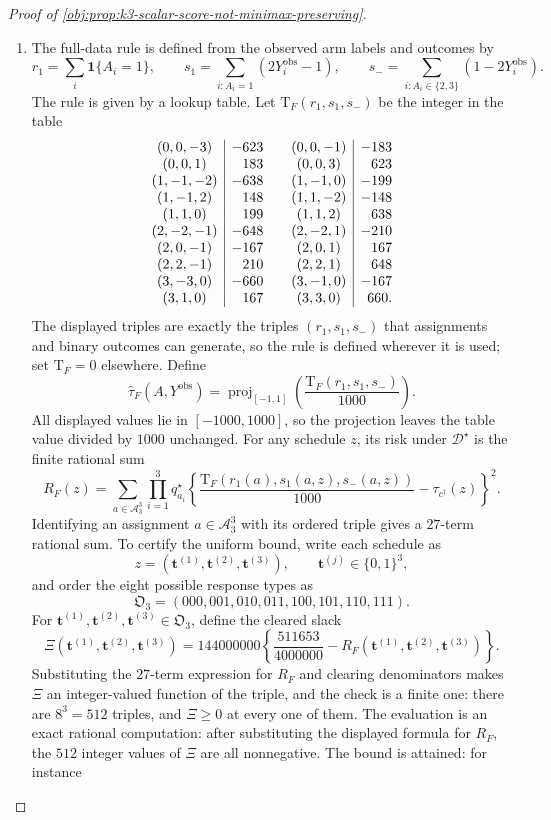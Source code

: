 \documentclass[11pt]{article}
\begin{document}
\begin{proof}[Proof of \cref{obj:prop:k3-scalar-score-not-minimax-preserving}]
\begin{enumerate}
\item
The full-data rule is defined from the observed arm labels and outcomes by
\[
r_1=\sum_i\mathbf 1\{A_i=1\},\qquad
s_1=\sum_{i:A_i=1}(2Y_i^{\mathrm{obs}}-1),\qquad
s_-=\sum_{i:A_i\in\{2,3\}}(1-2Y_i^{\mathrm{obs}}).
\]
The rule is given by a lookup table.  Let \(\mathrm T_F(r_1,s_1,s_-)\) be the integer in the table
\[
\begin{array}{c|r@{\qquad}c|r}
(0,0,-3)&-623&(0,0,-1)&-183\\
(0,0,1)&183&(0,0,3)&623\\
(1,-1,-2)&-638&(1,-1,0)&-199\\
(1,-1,2)&148&(1,1,-2)&-148\\
(1,1,0)&199&(1,1,2)&638\\
(2,-2,-1)&-648&(2,-2,1)&-210\\
(2,0,-1)&-167&(2,0,1)&167\\
(2,2,-1)&210&(2,2,1)&648\\
(3,-3,0)&-660&(3,-1,0)&-167\\
(3,1,0)&167&(3,3,0)&660 .
\end{array}
\]
The displayed triples are exactly the triples \((r_1,s_1,s_-)\) that assignments and binary outcomes can generate, so the rule is defined wherever it is used; set \(\mathrm T_F=0\) elsewhere. Define
\[
\widehat\tau_F(A,Y^{\mathrm{obs}})
=
\operatorname{proj}_{[-1,1]}\!\left(\frac{\mathrm T_F(r_1,s_1,s_-)}{1000}\right).
\]
All displayed values lie in \([-1000,1000]\), so the projection leaves the table value divided by \(1000\) unchanged. For any schedule \(z\), its risk under \(\mathcal D^\star\) is the finite rational sum
\[
R_F(z)
=
\sum_{a\in\mathcal A_3^3}
\prod_{i=1}^3 q^\star_{a_i}
\left\{
\frac{\mathrm T_F(r_1(a),s_1(a,z),s_-(a,z))}{1000}
-\tau_{c^\dagger}(z)
\right\}^2 .
\]
Identifying an assignment \(a\in\mathcal A_3^3\) with its ordered triple gives a \(27\)-term rational sum. To certify the uniform bound, write each schedule as
\[
z=(\mathbf t^{(1)},\mathbf t^{(2)},\mathbf t^{(3)}),
\qquad
\mathbf t^{(j)}\in\{0,1\}^3,
\]
and order the eight possible response types as
\[
\mathfrak O_3=(000,001,010,011,100,101,110,111).
\]
For \(\mathbf t^{(1)},\mathbf t^{(2)},\mathbf t^{(3)}\in\mathfrak O_3\), define the cleared slack
\[
\Xi(\mathbf t^{(1)},\mathbf t^{(2)},\mathbf t^{(3)})
=
144000000\left\{\frac{511653}{4000000}
-R_F(\mathbf t^{(1)},\mathbf t^{(2)},\mathbf t^{(3)})\right\}.
\]
Substituting the \(27\)-term expression for \(R_F\) and clearing denominators makes \(\Xi\) an integer-valued function of the triple, and the check is a finite one: there are \(8^3=512\) triples, and \(\Xi\ge 0\) at every one of them.  The evaluation is an exact rational computation: after substituting the displayed formula for \(R_F\), the \(512\) integer values of \(\Xi\) are all nonnegative.  The bound is attained: for instance

\end{enumerate}
\end{proof}
\end{document}
